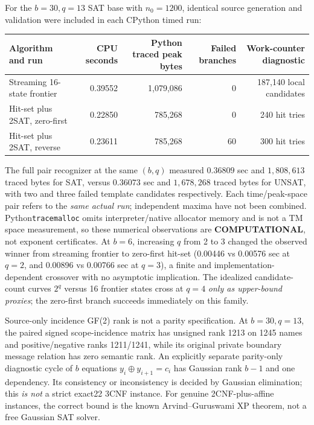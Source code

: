 \documentclass[10pt]{article}
\begin{document}
\noindent For the $b=30,q=13$ SAT base with $n_0=1200$, identical source generation and validation were included in each CPython timed run:
\begin{center}\small
\begin{tabular}{lrrrr}\toprule
Algorithm and run & CPU seconds & Python traced peak bytes & Failed branches & Work-counter diagnostic\\\midrule
Streaming 16-state frontier & 0.39552 & 1,079,086 & 0 & 187,140 local candidates\\
Hit-set plus 2SAT, zero-first & 0.22850 & 785,268 & 0 & 240 hit tries\\
Hit-set plus 2SAT, reverse & 0.23611 & 785,268 & 60 & 300 hit tries\\\bottomrule
\end{tabular}
\end{center}
\noindent The full pair recognizer at the same $(b,q)$ measured $0.36809$ sec and $1{,}808{,}613$ traced bytes for SAT, versus $0.36073$ sec and $1{,}678{,}268$ traced bytes for UNSAT, with two and three failed template candidates respectively. Each time/peak-space pair refers to the \emph{same actual run}; independent maxima have not been combined. Python\texttt{tracemalloc} omits interpreter/native allocator memory and is not a TM space measurement, so these numerical observations are \textbf{COMPUTATIONAL}, not exponent certificates. At $b=6$, increasing $q$ from 2 to 3 changed the observed winner from streaming frontier to zero-first hit-set (0.00446 vs 0.00576 sec at $q=2$, and 0.00896 vs 0.00766 sec at $q=3$), a finite and implementation-dependent crossover with no asymptotic implication. The idealized candidate-count curves $2^q$ versus 16 frontier states cross at $q=4$ \emph{only as upper-bound proxies}; the zero-first branch succeeds immediately on this family.

\noindent Source-only incidence GF(2) rank is not a parity specification. At $b=30,q=13$, the paired signed scope-incidence matrix has unsigned rank 1213 on 1245 names and positive/negative ranks 1211/1241, while its original private boundary message relation has zero semantic rank. An explicitly separate parity-only diagnostic cycle of $b$ equations $y_i\oplus y_{i+1}=c_i$ has Gaussian rank $b-1$ and one dependency. Its consistency or inconsistency is decided by Gaussian elimination; this \emph{is not} a strict exact22 3CNF instance. For genuine 2CNF-plus-affine instances, the correct bound is the known Arvind--Guruswami XP theorem, not a free Gaussian SAT solver.
\end{document}
